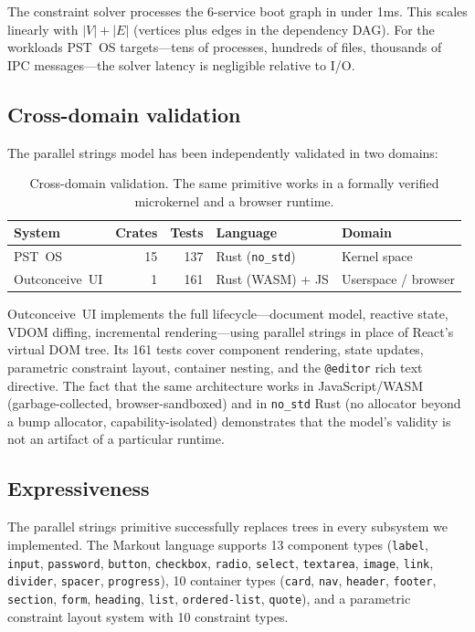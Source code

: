 \documentclass[11pt,a4paper]{article}
\begin{document}
The constraint solver processes the 6-service boot graph in under 1ms. This scales linearly with $|V| + |E|$ (vertices plus edges in the dependency DAG). For the workloads PST~OS targets---tens of processes, hundreds of files, thousands of IPC messages---the solver latency is negligible relative to I/O.

\subsection{Cross-domain validation}
\label{sec:crossdomain}

The parallel strings model has been independently validated in two domains:

\begin{table}[h]
\centering
\begin{tabular}{lrrll}
\toprule
\textbf{System} & \textbf{Crates} & \textbf{Tests} & \textbf{Language} & \textbf{Domain} \\
\midrule
PST~OS          & 15 & 137 & Rust (\texttt{no\_std}) & Kernel space \\
Outconceive~UI  & 1  & 161 & Rust (WASM) + JS       & Userspace / browser \\
\bottomrule
\end{tabular}
\caption{Cross-domain validation. The same primitive works in a formally verified microkernel and a browser runtime.}
\label{tab:crossdomain}
\end{table}

Outconceive~UI implements the full lifecycle---document model, reactive state, VDOM diffing, incremental rendering---using parallel strings in place of React's virtual DOM tree. Its 161 tests cover component rendering, state updates, parametric constraint layout, container nesting, and the \texttt{@editor} rich text directive. The fact that the same architecture works in JavaScript/WASM (garbage-collected, browser-sandboxed) and in \texttt{no\_std} Rust (no allocator beyond a bump allocator, capability-isolated) demonstrates that the model's validity is not an artifact of a particular runtime.

\subsection{Expressiveness}

The parallel strings primitive successfully replaces trees in every subsystem we implemented. The Markout language supports 13 component types (\texttt{label}, \texttt{input}, \texttt{password}, \texttt{button}, \texttt{checkbox}, \texttt{radio}, \texttt{select}, \texttt{textarea}, \texttt{image}, \texttt{link}, \texttt{divider}, \texttt{spacer}, \texttt{progress}), 10 container types (\texttt{card}, \texttt{nav}, \texttt{header}, \texttt{footer}, \texttt{section}, \texttt{form}, \texttt{heading}, \texttt{list}, \texttt{ordered-list}, \texttt{quote}), and a parametric constraint layout system with 10 constraint types.
\end{document}
